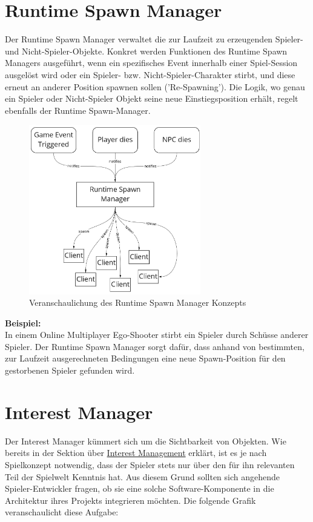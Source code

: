 \section{Runtime Spawn Manager}
\label{spawn_manager}

Der Runtime Spawn Manager verwaltet die zur Laufzeit zu erzeugenden Spieler- und Nicht-Spieler-Objekte. Konkret werden Funktionen des Runtime Spawn Managers ausgeführt, wenn ein spezifisches Event innerhalb einer Spiel-Session ausgelöst wird oder ein Spieler- bzw. Nicht-Spieler-Charakter stirbt, und diese erneut an anderer Position spawnen sollen ('Re-Spawning'). Die Logik, wo genau ein Spieler oder Nicht-Spieler Objekt seine neue Einstiegsposition erhält, regelt ebenfalls der Runtime Spawn-Manager.

\begin{figure}[H]
	\centering
	\includegraphics[width=75mm]{images/Runtime_Spawn_Manager.jpg}
	\caption[Runtime Spawn Manager]{Veranschaulichung des Runtime Spawn Manager Konzepts}
	\label{pic:Runtime_Spawn_Manager}
\end{figure}

\textbf{Beispiel:} \\
In einem Online Multiplayer Ego-Shooter \cite{Wikipedia.2021g} stirbt ein Spieler durch Schüsse anderer Spieler. Der Runtime Spawn Manager sorgt dafür, dass anhand von bestimmten, zur Laufzeit ausgerechneten Bedingungen eine neue Spawn-Position für den gestorbenen Spieler gefunden wird. 


\section{Interest Manager}

Der Interest Manager kümmert sich um die Sichtbarkeit von Objekten. Wie bereits in der Sektion über \hyperref[interest_management]{Interest Management} erklärt, ist es je nach Spielkonzept notwendig, dass der Spieler stets nur über den für ihn relevanten Teil der Spielwelt Kenntnis hat. Aus diesem Grund sollten sich angehende Spieler-Entwickler fragen, ob sie eine solche Software-Komponente in die Architektur ihres Projekts integrieren möchten. Die folgende Grafik veranschaulicht diese Aufgabe:

